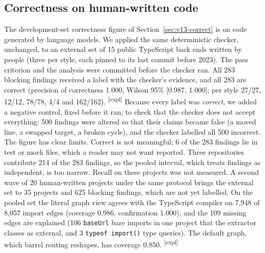 \documentclass[10pt,a4paper]{article}
\newcommand{\explor}{\textsuperscript{\textsf{\tiny[expl]}}}
\begin{document}
\subsection{Correctness on human-written code}\label{sec:v13-external}

The development-set correctness figure of Section~\ref{sec:v13-correct} is on code generated by language models.
We applied the same deterministic checker, unchanged, to an external set of 15 public TypeScript back ends written
by people (three per style, each pinned to its last commit before 2023). The pass criterion and the analysis were
committed before the checker ran. All 283 blocking findings received a label with the checker's evidence, and all
283 are correct (precision of correctness 1.000, Wilson 95\% [0.987, 1.000]; per style 27/27, 12/12, 78/78, 4/4 and
162/162). \explor{}
Because every label was \emph{correct}, we added a negative control, fixed before it ran, to check that the checker
does not accept everything: 500 findings were altered so that their claims became false (a moved line, a swapped
target, a broken cycle), and the checker labelled all 500 incorrect.
The figure has clear limits. Correct is not meaningful; 6 of the 283 findings lie in test or mock files, which a
reader may not want reported. Three repositories contribute 214 of the 283 findings, so the pooled interval, which
treats findings as independent, is too narrow. Recall on these projects was not measured.
A second wave of 20 human-written projects under the same protocol brings the external set to 35 projects and 625
blocking findings, which are not yet labelled. On the pooled set the literal graph view agrees with the TypeScript
compiler on 7,948 of 8,057 import edges (coverage 0.986, confirmation 1.000), and the 109 missing edges are explained
(106 \texttt{baseUrl} bare imports in one project that the extractor classes as external, and 3 \texttt{typeof
import()} type queries). The default graph, which barrel routing reshapes, has coverage 0.850.
\explor{}
\end{document}
